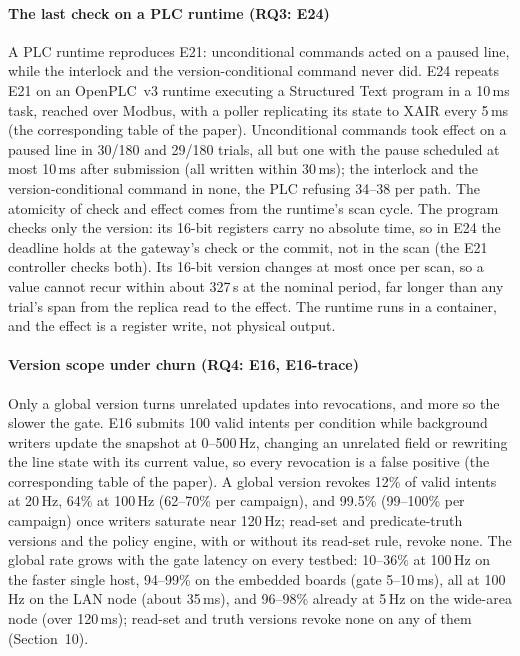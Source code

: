 \documentclass[11pt]{article}
\begin{document}
\paragraph{The last check on a PLC runtime (RQ3: E24)}
A PLC runtime reproduces E21: unconditional commands acted on a paused line, while the interlock and the version-conditional command never did. E24 repeats E21 on an OpenPLC~v3 runtime executing a Structured Text program in a 10\,ms task, reached over Modbus, with a poller replicating its state to XAIR every 5\,ms (the corresponding table of the paper). Unconditional commands took effect on a paused line in 30/180 and 29/180 trials, all but one with the pause scheduled at most 10\,ms after submission (all written within 30\,ms); the interlock and the version-conditional command in none, the PLC refusing 34--38 per path. The atomicity of check and effect comes from the runtime's scan cycle. The program checks only the version: its 16-bit registers carry no absolute time, so in E24 the deadline holds at the gateway's check or the commit, not in the scan (the E21 controller checks both). Its 16-bit version changes at most once per scan, so a value cannot recur within about 327\,s at the nominal period, far longer than any trial's span from the replica read to the effect. The runtime runs in a container, and the effect is a register write, not physical output.

\paragraph{Version scope under churn (RQ4: E16, E16-trace)}
Only a global version turns unrelated updates into revocations, and more so the slower the gate. E16 submits 100 valid intents per condition while background writers update the snapshot at 0--500\,Hz, changing an unrelated field or rewriting the line state with its current value, so every revocation is a false positive (the corresponding table of the paper). A global version revokes 12\% of valid intents at 20\,Hz, 64\% at 100\,Hz (62--70\% per campaign), and 99.5\% (99--100\% per campaign) once writers saturate near 120\,Hz; read-set and predicate-truth versions and the policy engine, with or without its read-set rule, revoke none. The global rate grows with the gate latency on every testbed: 10--36\% at 100\,Hz on the faster single host, 94--99\% on the embedded boards (gate 5--10\,ms), all at 100\,Hz on the LAN node (about 35\,ms), and 96--98\% already at 5\,Hz on the wide-area node (over 120\,ms); read-set and truth versions revoke none on any of them (Section~10).
\end{document}
